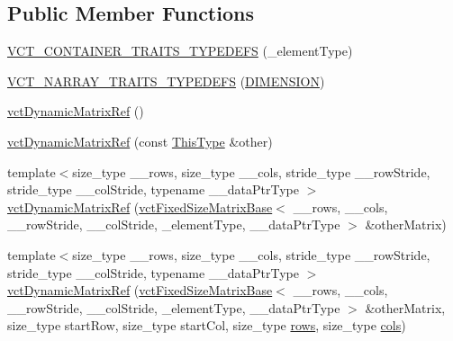 \subsection*{Public Member Functions}
\begin{DoxyCompactItemize}
\item 
\hyperlink{classvct_dynamic_matrix_ref_ad0afc0e12b9aa45b3b7f86c9c20210bc}{V\-C\-T\-\_\-\-C\-O\-N\-T\-A\-I\-N\-E\-R\-\_\-\-T\-R\-A\-I\-T\-S\-\_\-\-T\-Y\-P\-E\-D\-E\-F\-S} (\-\_\-element\-Type)
\item 
\hyperlink{classvct_dynamic_matrix_ref_a31b115e4d57772c29d3bd6594c94dd9a}{V\-C\-T\-\_\-\-N\-A\-R\-R\-A\-Y\-\_\-\-T\-R\-A\-I\-T\-S\-\_\-\-T\-Y\-P\-E\-D\-E\-F\-S} (\hyperlink{classvct_dynamic_matrix_ref_a296ccb28efb27cc7c51864f9e81b77eca26570951ef99650f548cdec008ae4444}{D\-I\-M\-E\-N\-S\-I\-O\-N})
\item 
\hyperlink{classvct_dynamic_matrix_ref_ab235b68c2cebc19b68040b3fd9f5147a}{vct\-Dynamic\-Matrix\-Ref} ()
\item 
\hyperlink{classvct_dynamic_matrix_ref_a020565b599ed5ddc765184d60fd239e7}{vct\-Dynamic\-Matrix\-Ref} (const \hyperlink{classvct_dynamic_matrix_ref_ac01200e3df0afe95f5d3948da84c8551}{This\-Type} \&other)
\item 
{\footnotesize template$<$size\-\_\-type \-\_\-\-\_\-rows, size\-\_\-type \-\_\-\-\_\-cols, stride\-\_\-type \-\_\-\-\_\-row\-Stride, stride\-\_\-type \-\_\-\-\_\-col\-Stride, typename \-\_\-\-\_\-data\-Ptr\-Type $>$ }\\\hyperlink{classvct_dynamic_matrix_ref_aca2bfa15f7345b8f91a9d6f800e4ad7c}{vct\-Dynamic\-Matrix\-Ref} (\hyperlink{classvct_fixed_size_matrix_base}{vct\-Fixed\-Size\-Matrix\-Base}$<$ \-\_\-\-\_\-rows, \-\_\-\-\_\-cols, \-\_\-\-\_\-row\-Stride, \-\_\-\-\_\-col\-Stride, \-\_\-element\-Type, \-\_\-\-\_\-data\-Ptr\-Type $>$ \&other\-Matrix)
\item 
{\footnotesize template$<$size\-\_\-type \-\_\-\-\_\-rows, size\-\_\-type \-\_\-\-\_\-cols, stride\-\_\-type \-\_\-\-\_\-row\-Stride, stride\-\_\-type \-\_\-\-\_\-col\-Stride, typename \-\_\-\-\_\-data\-Ptr\-Type $>$ }\\\hyperlink{classvct_dynamic_matrix_ref_a7c062ad630ab45b933928d8031fb438c}{vct\-Dynamic\-Matrix\-Ref} (\hyperlink{classvct_fixed_size_matrix_base}{vct\-Fixed\-Size\-Matrix\-Base}$<$ \-\_\-\-\_\-rows, \-\_\-\-\_\-cols, \-\_\-\-\_\-row\-Stride, \-\_\-\-\_\-col\-Stride, \-\_\-element\-Type, \-\_\-\-\_\-data\-Ptr\-Type $>$ \&other\-Matrix, size\-\_\-type start\-Row, size\-\_\-type start\-Col, size\-\_\-type \hyperlink{classvct_dynamic_const_matrix_base_a5eac13be2207ebeb8766cde379d73438}{rows}, size\-\_\-type \hyperlink{classvct_dynamic_const_matrix_base_aa6c51d41a100da49a7e7ac7edb20ecd9}{cols})

\end{DoxyCompactItemize}
